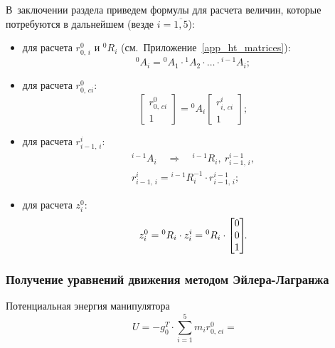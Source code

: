В~заключении раздела приведем формулы для расчета величин, которые потребуются в дальнейшем (везде $i = \overline{1,5}$):
\begin{itemize}
    \item для расчета $r^0_{0,\,i}$ и ${}^{0}R_i$ (см.~Приложение~\ref{app_ht_matrices}):
        \begin{equation}
            {}^0A_i = {}^0A_1 \cdot {}^1A_2 \cdot \ldots \cdot {}^{i-1}A_i;
        \end{equation}
    \item для расчета $r^0_{0,\,ci}$:
        \begin{equation}
            \begin{bmatrix}
                r^0_{0,\,ci} \\ 1
            \end{bmatrix}
            = {}^0A_i
            \begin{bmatrix}
            r^i_{i,\,ci} \\ 1
            \end{bmatrix}\!\!;
        \end{equation}
    \item для расчета $r^i_{i-1,\,i}$:
        \begin{gather}
            {}^{i-1}A_i \quad \Rightarrow \quad {}^{i-1}R_i,\: r^{i-1}_{i-1,\,i},
            \\
            r^i_{i-1,\,i} = {}^{i-1}R_i^{-1} \!\cdot r^{i-1}_{i-1,\,i};
        \end{gather}
    \item для расчета $z^0_i$:
        \begin{equation}
            z^0_i = {}^{0}R_i \cdot z^i_i = {}^{0}R_i \cdot
            \begin{bmatrix}
                0 \\ 0 \\ 1
            \end{bmatrix}\!\!\ldotp
        \end{equation}
\end{itemize}

\subsubsection{Получение уравнений движения методом Эйлера-Лагранжа}
Потенциальная энергия манипулятора
\begin{equation}
    U = -g_0^T \cdot \sum_{i = 1}^5 m_ir^0_{0,\,ci} =
\end{equation}

